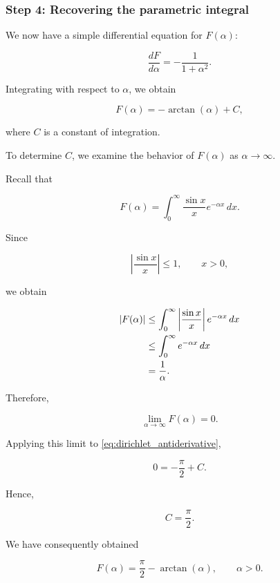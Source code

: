 \documentclass[11pt,a4paper]{article}
\theoremstyle{definition}
\theoremstyle{remark}
\begin{document}
\subsubsection*{Step 4: Recovering the parametric integral}

We now have a simple differential
equation for $F(\alpha)$:

\[
    \frac{dF}{d\alpha}
    =
    -\frac{1}{1+\alpha^2}.
\]

Integrating with respect to
$\alpha$, we obtain

\begin{equation}
    F(\alpha)
    =
    -\arctan(\alpha)+C,
    \label{eq:dirichlet_antiderivative}
\end{equation}

where $C$ is a constant
of integration.

To determine $C$, we examine
the behavior of $F(\alpha)$
as $\alpha\to\infty$.

Recall that

\[
    F(\alpha)
    =
    \int_0^\infty
    \frac{\sin x}{x}e^{-\alpha x}\,dx.
\]

Since

\[
    \left|\frac{\sin x}{x}\right|
    \leq 1,
    \qquad x>0,
\]

we obtain

\begin{align}
    |F(\alpha)|
    &\leq
    \int_0^\infty
    \left|\frac{\sin x}{x}\right|
    e^{-\alpha x}\,dx
    \notag\\
    &\leq
    \int_0^\infty e^{-\alpha x}\,dx
    \notag\\
    &=
    \frac{1}{\alpha}.
\end{align}

Therefore,

\[
    \lim_{\alpha\to\infty}
    F(\alpha)=0.
\]

Applying this limit to
\eqref{eq:dirichlet_antiderivative},

\[
    0
    =
    -\frac{\pi}{2}+C.
\]

Hence,

\[
    C=\frac{\pi}{2}.
\]

We have consequently obtained

\begin{equation}
    \boxed{
    F(\alpha)
    =
    \frac{\pi}{2}-\arctan(\alpha),
    \qquad \alpha>0.
    }
    \label{eq:dirichlet_parametric_result}
\end{equation}
\end{document}
